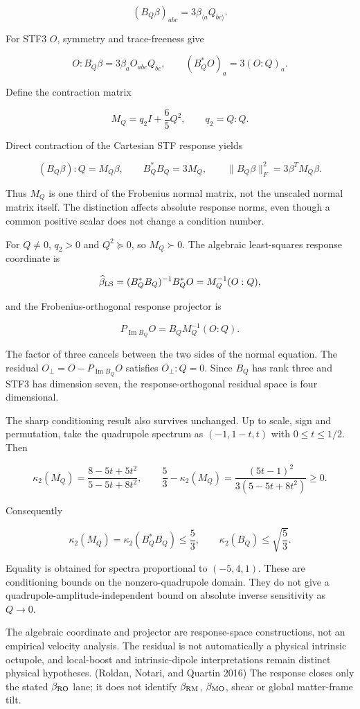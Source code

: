 \documentclass[
  11pt,
  a4paper]{article}
\begin{document}
\[
(B_Q\beta)_{abc}=3\beta_{\langle a}Q_{bc\rangle}.
\]

For STF3 \(O\), symmetry and trace-freeness give

\[
O:B_Q\beta=3\beta_aO_{abc}Q_{bc},
\qquad (B_Q^*O)_a=3(O:Q)_a.
\]

Define the contraction matrix

\[
M_Q=q_2I+\frac65Q^2,\qquad q_2=Q:Q.
\]

Direct contraction of the Cartesian STF response yields

\[
(B_Q\beta):Q=M_Q\beta,
\qquad
\boxed{B_Q^*B_Q=3M_Q},
\qquad
\|B_Q\beta\|_F^2=3\beta^TM_Q\beta.
\]

Thus \(M_Q\) is one third of the Frobenius normal matrix, not the unscaled
normal matrix itself. The distinction affects absolute response norms, even
though a common positive scalar does not change a condition number.

For \(Q\ne0\), \(q_2>0\) and \(Q^2\succeq0\), so \(M_Q\succ0\).
The algebraic least-squares response coordinate is

\[
\widehat\beta_{\rm LS}
=(B_Q^*B_Q)^{-1}B_Q^*O
=M_Q^{-1}(O:Q),
\]

and the Frobenius-orthogonal response projector is

\[
P_{\operatorname{Im}B_Q}O=B_QM_Q^{-1}(O:Q).
\]

The factor of three cancels between the two sides of the normal equation.
The residual \(O_\perp=O-P_{\operatorname{Im}B_Q}O\) satisfies
\(O_\perp:Q=0\). Since \(B_Q\) has rank three and STF3 has dimension seven,
the response-orthogonal residual space is four dimensional.

The sharp conditioning result also survives unchanged. Up to scale, sign and
permutation, take the quadrupole spectrum as \((-1,1-t,t)\) with
\(0\le t\le1/2\). Then

\[
\kappa_2(M_Q)=\frac{8-5t+5t^2}{5-5t+8t^2},
\qquad
\frac53-\kappa_2(M_Q)
=\frac{(5t-1)^2}{3(5-5t+8t^2)}\ge0.
\]

Consequently

\[
\kappa_2(M_Q)=\kappa_2(B_Q^*B_Q)\le\frac53,
\qquad \kappa_2(B_Q)\le\sqrt{\frac53}.
\]

Equality is obtained for spectra proportional to \((-5,4,1)\). These are
conditioning bounds on the nonzero-quadrupole domain. They do not give a
quadrupole-amplitude-independent bound on absolute inverse sensitivity as
\(Q\to0\).

The algebraic coordinate and projector are response-space constructions, not
an empirical velocity analysis. The residual is not automatically a physical
intrinsic octupole, and local-boost and intrinsic-dipole interpretations remain
distinct physical hypotheses. (Roldan, Notari, and Quartin 2016)
The response closes only the stated \(\beta_{\rm RO}\) lane; it does not
identify \(\beta_{\rm RM}\), \(\beta_{\rm MO}\), shear or global matter-frame
tilt.
\end{document}
